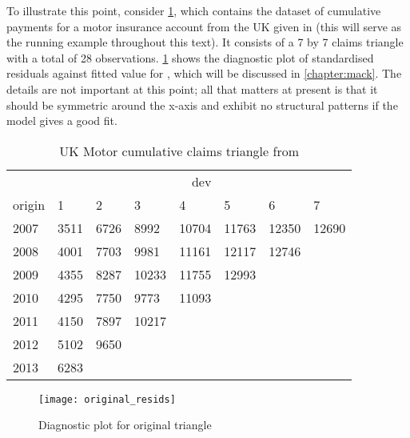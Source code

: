 \documentclass[a4paper]{book}
\begin{document}
To illustrate this point, consider \cref{tab:uk-motor}, which contains the dataset of cumulative payments for a motor insurance account from the UK given in \cite{christofides} (this will serve as the running example throughout this text). It consists of a 7 by 7 claims triangle with a total of 28 observations. \cref{fig:diag-plot-original} shows the diagnostic plot of standardised residuals against fitted value for , which will be discussed in \cref{chapter:mack}. The details are not important at this point; all that matters at present is that it should be symmetric around the x-axis and exhibit no structural patterns if the model gives a good fit.

\begin{table}[!htb]
  \centering
  \begin{tabularx}{0.7\linewidth}{XXXXXXXX} \toprule
           & \multicolumn{7}{c}{dev}                                                \\ \cmidrule{2-8}
    origin & 1                       & 2    & 3     & 4     & 5     & 6     & 7     \\ \midrule
    2007   & 3511                    & 6726 & 8992  & 10704 & 11763 & 12350 & 12690 \\
    2008   & 4001                    & 7703 & 9981  & 11161 & 12117 & 12746 &       \\
    2009   & 4355                    & 8287 & 10233 & 11755 & 12993 &       &       \\
    2010   & 4295                    & 7750 & 9773  & 11093 &       &       &       \\
    2011   & 4150                    & 7897 & 10217 &       &       &       &       \\
    2012   & 5102                    & 9650 &       &       &       &       &       \\
    2013   & 6283                    &      &       &       &       &       &       \\
    \bottomrule
  \end{tabularx}
  \caption{UK Motor cumulative claims triangle from \textcite{christofides}}
  \label{tab:uk-motor}
\end{table}

\begin{figure}[!htb]
  \centering
  \texttt{[image: original\_resids]}
  \caption{Diagnostic plot for original triangle}
  \label{fig:diag-plot-original}
\end{figure}
\end{document}
